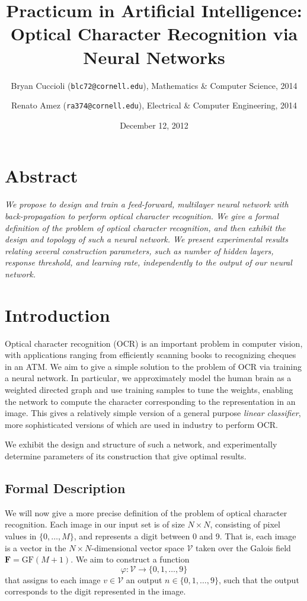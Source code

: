 \documentclass[11pt]{article}
\title{Practicum in Artificial Intelligence:\\ Optical Character Recognition via Neural Networks}
\date{December 12, 2012}
\author{Bryan Cuccioli (\texttt{blc72@cornell.edu}), Mathematics \& Computer Science, 2014\\
\and
Renato Amez (\texttt{ra374@cornell.edu}), Electrical \& Computer Engineering, 2014}
\begin{document}
\maketitle
\tableofcontents
\pagebreak

\section{Abstract}

\emph{
We propose to design and train a feed-forward, multilayer neural network with back-propagation to perform optical character recognition. We give a formal definition of the problem of optical character recognition, and then exhibit the design and topology of such a neural network. We present experimental results relating several construction parameters, such as number of hidden layers, response threshold, and learning rate, independently to the output of our neural network.
}

\section{Introduction}
Optical character recognition (OCR) is an important problem in computer vision, with applications ranging from efficiently scanning books to recognizing cheques in an ATM. We aim to give a simple solution to the problem of OCR via training a neural network. In particular, we approximately model the human brain as a weighted directed graph and use training samples to tune the weights, enabling the network to compute the character corresponding to the representation in an image. This gives a relatively simple version of a general purpose \emph{linear classifier}, more sophisticated versions of which are used in industry to perform OCR.

We exhibit the design and structure of such a network, and experimentally determine parameters of its construction that give optimal results.

\subsection{Formal Description}

We will now give a more precise definition of the problem of optical character recognition. Each image in our input set is of size $N\times N$, consisting of pixel values in $\{0,\dots,M\}$, and represents a digit between 0 and 9. That is, each image is a vector in the $N\times N$-dimensional vector space $\mathscr{V}$ taken over the Galois field $\mathbf{F}=\mathrm{GF}(M+1)$. We aim to construct a function
\begin{equation}\varphi:\mathscr{V}\xrightarrow{\ \ \ } \{0,1,\dots,9\}\end{equation}
that assigns to each image $v\in\mathscr{V}$ an output $n\in \{0,1,\dots,9\}$, such that the output corresponds to the digit represented in the image.
\end{document}
